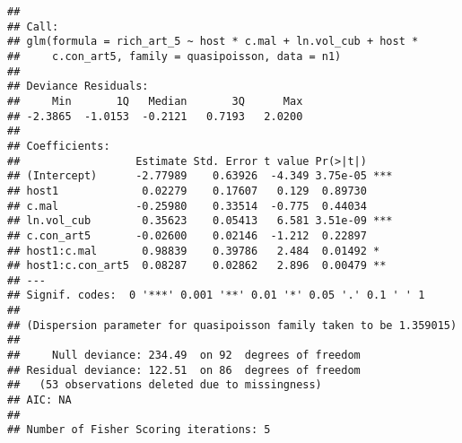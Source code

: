 \documentclass[]{article}
\newenvironment{Shaded}{\begin{snugshade}}{\end{snugshade}}
\newcommand{\KeywordTok}[1]{\textcolor[rgb]{0.13,0.29,0.53}{\textbf{#1}}}
\newcommand{\DataTypeTok}[1]{\textcolor[rgb]{0.13,0.29,0.53}{#1}}
\newcommand{\DecValTok}[1]{\textcolor[rgb]{0.00,0.00,0.81}{#1}}
\newcommand{\StringTok}[1]{\textcolor[rgb]{0.31,0.60,0.02}{#1}}
\newcommand{\CommentTok}[1]{\textcolor[rgb]{0.56,0.35,0.01}{\textit{#1}}}
\newcommand{\OperatorTok}[1]{\textcolor[rgb]{0.81,0.36,0.00}{\textbf{#1}}}
\newcommand{\NormalTok}[1]{#1}
\begin{document}
\begin{verbatim}
## 
## Call:
## glm(formula = rich_art_5 ~ host * c.mal + ln.vol_cub + host * 
##     c.con_art5, family = quasipoisson, data = n1)
## 
## Deviance Residuals: 
##     Min       1Q   Median       3Q      Max  
## -2.3865  -1.0153  -0.2121   0.7193   2.0200  
## 
## Coefficients:
##                  Estimate Std. Error t value Pr(>|t|)    
## (Intercept)      -2.77989    0.63926  -4.349 3.75e-05 ***
## host1             0.02279    0.17607   0.129  0.89730    
## c.mal            -0.25980    0.33514  -0.775  0.44034    
## ln.vol_cub        0.35623    0.05413   6.581 3.51e-09 ***
## c.con_art5       -0.02600    0.02146  -1.212  0.22897    
## host1:c.mal       0.98839    0.39786   2.484  0.01492 *  
## host1:c.con_art5  0.08287    0.02862   2.896  0.00479 ** 
## ---
## Signif. codes:  0 '***' 0.001 '**' 0.01 '*' 0.05 '.' 0.1 ' ' 1
## 
## (Dispersion parameter for quasipoisson family taken to be 1.359015)
## 
##     Null deviance: 234.49  on 92  degrees of freedom
## Residual deviance: 122.51  on 86  degrees of freedom
##   (53 observations deleted due to missingness)
## AIC: NA
## 
## Number of Fisher Scoring iterations: 5
\end{verbatim}

\begin{Shaded}
\end{Shaded}
\end{document}
